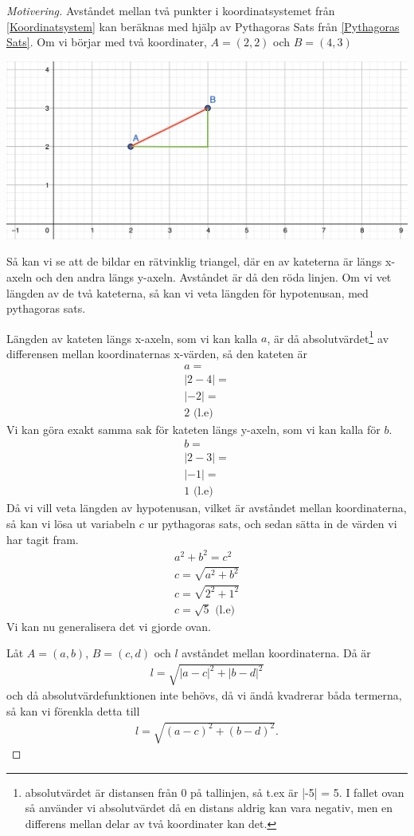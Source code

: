 \begin{proof}[Motivering]
Avståndet mellan två punkter i koordinatsystemet från \ref{Koordinatsystem} kan beräknas med hjälp av Pythagoras Sats från \ref{Pythagoras Sats}. Om vi börjar med två koordinater, $A=(2,2)$ och $B=(4,3)$

\includegraphics[width=\textwidth]{img/3.png}

Så kan vi se att de bildar en rätvinklig triangel, där en av kateterna är längs x-axeln och den andra längs y-axeln. Avståndet är då den röda linjen. Om vi vet längden av de två kateterna, så kan vi veta längden för hypotenusan, med pythagoras sats.

Längden av kateten längs x-axeln, som vi kan kalla $a$, är då absolutvärdet\footnote{absolutvärdet är distansen från $0$ på tallinjen, så t.ex är |-5| = 5. I fallet ovan så använder vi absolutvärdet då en distans aldrig kan vara negativ, men en differens mellan delar av två koordinater kan det.} av differensen mellan koordinaternas x-värden, så den kateten är
\begin{align*}
	a = \\
	|2-4| = \\
	|-2| = \\
	2 \text{ (l.e)}
\end{align*}
Vi kan göra exakt samma sak för kateten längs y-axeln, som vi kan kalla för $b$.
\begin{align*}
	b = \\
	|2-3| = \\
	|-1| = \\
	1 \text{ (l.e)}
\end{align*}
Då vi vill veta längden av hypotenusan, vilket är avståndet mellan koordinaterna, så kan vi lösa ut variabeln $c$ ur pythagoras sats, och sedan sätta in de värden vi har tagit fram.
\begin{align*}
	a^2+b^2=c^2 \\
	c = \sqrt{a^2+b^2} \\
	c = \sqrt{2^2+1^2} \\
	c = \sqrt{5} \text{ (l.e)}
\end{align*}
Vi kan nu generalisera det vi gjorde ovan. 

Låt $A=(a,b)$, $B=(c,d)$ och $l$  avståndet mellan koordinaterna. Då är
\begin{align*}
	l = \sqrt{|a-c|^2+|b-d|^2}
\end{align*}
och då absolutvärdefunktionen inte behövs, då vi ändå kvadrerar båda termerna, så kan vi förenkla detta till
\begin{align}
	l = \sqrt{(a-c)^2+(b-d)^2}.
\end{align}
\end{proof}

